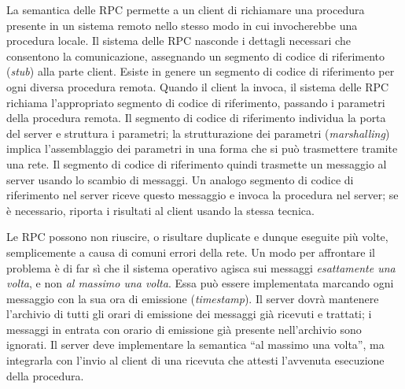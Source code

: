 \documentclass[11pt,a4paper]{article}
\begin{document}
La semantica delle RPC permette a un client di richiamare una procedura presente in
un sistema remoto nello stesso modo in cui invocherebbe una procedura locale. Il sistema
delle RPC nasconde i dettagli necessari che consentono la comunicazione, assegnando un
segmento di codice di riferimento (\emph{stub}) alla parte client. Esiste in genere un segmento di
codice di riferimento per ogni diversa procedura remota. Quando il client la invoca, il siste­ma delle RPC richiama l'appropriato segmento di codice di riferimento, passando i parame­tri della procedura remota. Il segmento di codice di riferimento individua la porta del server
e struttura i parametri; la strutturazione dei parametri (\emph{marshalling}) implica l'assemblaggio
dei parametri in una forma che si può trasmettere tramite una rete. Il segmento di codice di
riferimento quindi trasmette un messaggio al server usando lo scambio di messaggi. Un ana­logo segmento di codice di riferimento nel server riceve questo messaggio e invoca la proce­dura nel server; se è necessario, riporta i risultati al client usando la stessa tecnica.

Le RPC possono non riuscire, o risultare du­plicate e dunque eseguite più volte, semplicemente a causa di comuni errori della rete. Un
modo per affrontare il problema è di far sì che il sistema operativo agisca sui messaggi \emph{esat­tamente una volta}, e non \emph{al massimo una volta}.
Essa può essere implementata
marcando ogni messaggio con la sua ora di emissione (\emph{timestamp}). Il server dovrà mantene­re l'archivio di tutti gli orari di emissione dei messaggi già ricevuti e trattati; i messaggi in entrata
con orario di emissione già presente nell'archivio sono ignorati.
Il server deve imple­mentare la semantica “al massimo una volta”, ma integrarla con l'invio al client di una rice­vuta che attesti l'avvenuta esecuzione della procedura.
\end{document}
